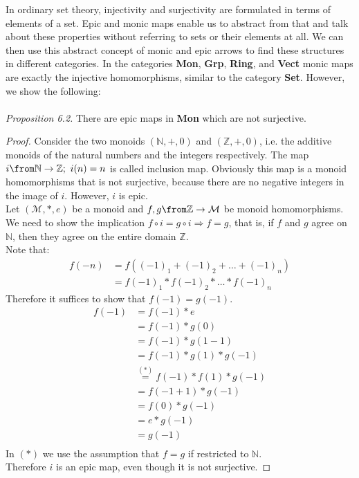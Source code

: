 In ordinary set theory, injectivity and surjectivity are formulated in terms of elements of a set.
Epic and monic maps enable us to abstract from that and
talk about these properties without referring to sets or their elements at all.
We can then use this abstract concept of monic and epic arrows to find these structures
in different categories.
In the categories \textbf{Mon}, \textbf{Grp}, \textbf{Ring}, and \textbf{Vect}
monic maps are exactly the injective homomorphisms,
similar to the category \textbf{Set}.
However, we show the following: \\
\\\textit{Proposition 6.2.} There are epic maps in \textbf{Mon} which are not surjective.
\begin{proof}
  Consider the two monoids $(\mathbb{N}, +, 0)$ and $(\mathbb{Z}, +, 0)$, i.e. the
  additive monoids of the natural numbers and the integers respectively.
  The map $i \from \mathbb{N} \to \mathbb{Z}; \ i(n) = n$ is called inclusion map.
  Obviously this map is a monoid homomorphisms that is not surjective,
  because there are no negative integers in the image of $i$.
  However, $i$ is epic.\\
  Let $(\mathcal{M}, *, e)$ be a monoid and $f, g \from \mathbb{Z} \to \mathcal{M}$ be
  monoid homomorphisms.\\
  We need to show the implication $f \circ i = g \circ i \Rightarrow f = g$, that is,
  if $f$ and $g$ agree on $\mathbb{N}$, then they agree on the entire domain $\mathbb{Z}$.\\
  Note that:
  \begin{align*}
    f(-n) &= f ((-1)_1 + (-1)_2 + \dots + (-1)_n)\\
          &= f(-1)_1 * f(-1)_2 * \dots * f(-1)_n
  \end{align*}
  Therefore it suffices to show that $f(-1) = g(-1)$.
  \begin{align*}
    f(-1) &= f(-1) * e \\
          &= f(-1) * g(0) \\
          &= f(-1) * g(1 - 1) \\
          &= f(-1) * g(1) * g(-1) \\
          &\overset{(*)}{=} f(-1) * f(1) * g(-1) \\
          &= f(-1 + 1) * g(-1) \\
          &= f(0) * g(-1) \\
          &= e * g(-1) \\
          &= g(-1) \\ 
  \end{align*}
  In $(*)$ we use the assumption that $f=g$ if restricted to $\mathbb{N}$.\\
  Therefore $i$ is an epic map, even though it is not surjective.
\end{proof}

